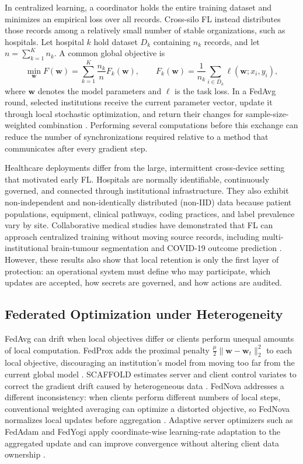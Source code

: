 In centralized learning, a coordinator holds the entire training dataset and minimizes an empirical loss over all records. Cross-silo FL instead distributes those records among a relatively small number of stable organizations, such as hospitals. Let hospital $k$ hold dataset $D_k$ containing $n_k$ records, and let $n=\sum_{k=1}^{K} n_k$. A common global objective is
\begin{equation}
    \min_{\mathbf{w}} F(\mathbf{w})
    = \sum_{k=1}^{K}\frac{n_k}{n}F_k(\mathbf{w}),
    \qquad
    F_k(\mathbf{w})=\frac{1}{n_k}\sum_{i\in D_k}\ell(\mathbf{w};x_i,y_i),
    \label{eq:fl-objective}
\end{equation}
where $\mathbf{w}$ denotes the model parameters and $\ell$ is the task loss. In a FedAvg round, selected institutions receive the current parameter vector, update it through local stochastic optimization, and return their changes for sample-size-weighted combination \cite{mcmahan2017fedavg}. Performing several computations before this exchange can reduce the number of synchronizations required relative to a method that communicates after every gradient step.

Healthcare deployments differ from the large, intermittent cross-device setting that motivated early FL. Hospitals are normally identifiable, continuously governed, and connected through institutional infrastructure. They also exhibit non-independent and non-identically distributed (non-IID) data because patient populations, equipment, clinical pathways, coding practices, and label prevalence vary by site. Collaborative medical studies have demonstrated that FL can approach centralized training without moving source records, including multi-institutional brain-tumour segmentation and COVID-19 outcome prediction \cite{sheller2020federated,dayan2021federated}. However, these results also show that local retention is only the first layer of protection: an operational system must define who may participate, which updates are accepted, how secrets are governed, and how actions are audited.

\subsection{Federated Optimization under Heterogeneity}

FedAvg can drift when local objectives differ or clients perform unequal amounts of local computation. FedProx adds the proximal penalty $\frac{\mu}{2}\lVert\mathbf{w}-\mathbf{w}_t\rVert_2^2$ to each local objective, discouraging an institution's model from moving too far from the current global model \cite{li2020fedprox}. SCAFFOLD estimates server and client control variates to correct the gradient drift caused by heterogeneous data \cite{karimireddy2020scaffold}. FedNova addresses a different inconsistency: when clients perform different numbers of local steps, conventional weighted averaging can optimize a distorted objective, so FedNova normalizes local updates before aggregation \cite{wang2020fednova}. Adaptive server optimizers such as FedAdam and FedYogi apply coordinate-wise learning-rate adaptation to the aggregated update and can improve convergence without altering client data ownership \cite{reddi2021adaptive}.

